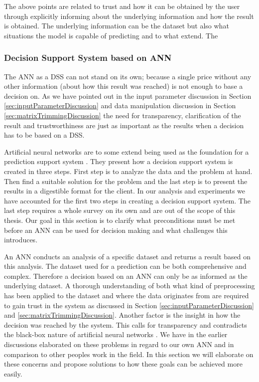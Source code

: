 The above points are related to trust and how it can be obtained by the user through explicitly informing about the underlying information and how the result is obtained. The underlying information can be the dataset but also what situations the model is capable of predicting and to what extend. The

\subsubsection{Decision Support System based on ANN}
The ANN as a DSS can not stand on its own; because a single price without any other information (about how this result was reached) is not enough to base a decision on. As we have pointed out in the input parameter discussion in Section \ref{sec:inputParameterDiscussion} and data manipulation discussion in Section \ref{sec:matrixTrimmingDiscussion} the need for transparency, clarification of the result and trustworthiness are just as important as the results when a decision has to be based on a DSS.

Artificial neural networks are to some extend being used as the foundation for a prediction support system \cite{shim2002past}. They present how a decision support system is created in three steps. First step is to analyze the data and the problem at hand. Then find a suitable solution for the problem and the last step is to present the results in a digestible format for the client. In our analysis and experiments we have accounted for the first two steps in creating a decision support system. The last step requires a whole survey on its own and are out of the scope of this thesis. Our goal in this section is to clarify what preconditions must be met before an ANN can be used for decision making and what challenges this introduces.

An ANN conducts an analysis of a specific dataset and returns a result based on this analysis. The dataset used for a prediction can be both comprehensive and complex. Therefore a decision based on an ANN can only be as informed as the underlying dataset. A thorough understanding of both what kind of preprocessing has been applied to the dataset and where the data originates from are required to gain trust in the system as discussed in Section \ref{sec:inputParameterDiscussion} and \ref{sec:matrixTrimmingDiscussion}. Another factor is the insight in how the decision was reached by the system. This calls for transparency and contradicts the black-box nature of artificial neural networks \cite{fromBlackBoxToTransparentBox}. We have in the earlier discussions elaborated on these problems in regard to our own ANN and in comparison to other peoples work in the field. In this section we will elaborate on these concerns and propose solutions to how these goals can be achieved more easily.

